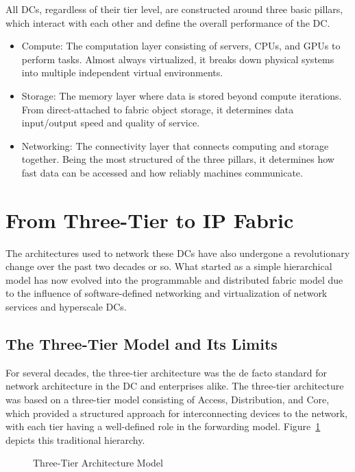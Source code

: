 All DCs, regardless of their tier level, are constructed around three basic pillars, which interact with each other and define the overall performance of the DC\cite{Cisco_DC_design}.
\begin{itemize}
    \item Compute: The computation layer consisting of servers, CPUs, and GPUs to perform tasks. Almost always virtualized, it breaks down physical systems into multiple independent virtual environments.
    \item Storage: The memory layer where data is stored beyond compute iterations. From direct-attached to fabric object storage, it determines data input/output speed and quality of service.
    \item Networking: The connectivity layer that connects computing and storage together. Being the most structured of the three pillars, it determines how fast data can be accessed and how reliably machines communicate.
\end{itemize}

\section{From Three-Tier to IP Fabric}
The architectures used to network these DCs have also undergone a revolutionary change over the past two decades or so. What started as a simple hierarchical model has now evolved into the programmable and distributed fabric model due to the influence of software-defined networking and virtualization of network services and hyperscale DCs.

\subsection*{The Three-Tier Model and Its Limits}
For several decades, the three-tier architecture was the de facto standard for network architecture in the DC and enterprises alike\cite{Campus_Network_Design_Guide}. The three-tier architecture was based on a three-tier model consisting of Access, Distribution, and Core, which provided a structured approach for interconnecting devices to the network, with each tier having a well-defined role in the forwarding model. Figure~\ref{fig:three-tier-model} depicts this traditional hierarchy.

\begin{figure}[!htbp]
    \centering
    \Architecturethreetier
    \caption{Three-Tier Architecture Model}
    \label{fig:three-tier-model}
\end{figure}

